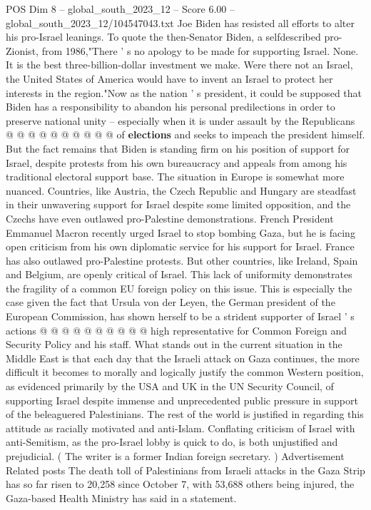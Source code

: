 \begin{textsample}{POS Dim 8 – global\_south\_2023\_12 – Score 6.00 – global\_south\_2023\_12/104547043.txt}
Joe Biden has resisted all efforts to alter his pro-Israel leanings.
To quote the then-Senator Biden, a selfdescribed pro-Zionist, from 1986,"There ' s no apology to be made for supporting Israel.
None.
It is the best three-billion-dollar investment we make.
Were there not an Israel, the United States of America would have to invent an Israel to protect her interests in the region."Now as the nation ' s president, it could be supposed that Biden has a responsibility to abandon his personal predilections in order to preserve national unity -- especially when it is under assault by the Republicans @ @ @ @ @ @ @ @ @ @ of \textbf{elections} and seeks to impeach the president himself.
But the fact remains that Biden is standing firm on his position of support for Israel, despite protests from his own bureaucracy and appeals from among his traditional electoral support base.
The situation in Europe is somewhat more nuanced.
Countries, like Austria, the Czech Republic and Hungary are steadfast in their unwavering support for Israel despite some limited opposition, and the Czechs have even outlawed pro-Palestine demonstrations.
French President Emmanuel Macron recently urged Israel to stop bombing Gaza, but he is facing open criticism from his own diplomatic service for his support for Israel.
France has also outlawed pro-Palestine protests.
But other countries, like Ireland, Spain and Belgium, are openly critical of Israel.
This lack of uniformity demonstrates the fragility of a common EU foreign policy on this issue.
This is especially the case given the fact that Ursula von der Leyen, the German president of the European Commission, has shown herself to be a strident supporter of Israel ' s actions @ @ @ @ @ @ @ @ @ @ high representative for Common Foreign and Security Policy and his staff.
What stands out in the current situation in the Middle East is that each day that the Israeli attack on Gaza continues, the more difficult it becomes to morally and logically justify the common Western position, as evidenced primarily by the USA and UK in the UN Security Council, of supporting Israel despite immense and unprecedented public pressure in support of the beleaguered Palestinians.
The rest of the world is justified in regarding this attitude as racially motivated and anti-Islam.
Conflating criticism of Israel with anti-Semitism, as the pro-Israel lobby is quick to do, is both unjustified and prejudicial. ( The writer is a former Indian foreign secretary. ) Advertisement Related posts The death toll of Palestinians from Israeli attacks in the Gaza Strip has so far risen to 20,258 since October 7, with 53,688 others being injured, the Gaza-based Health Ministry has said in a statement.

\end{textsample}
